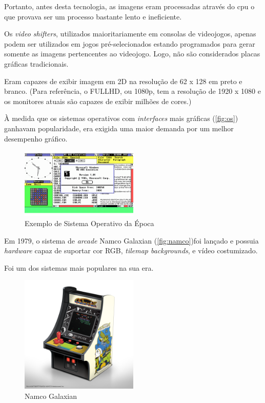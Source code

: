 \documentclass{report}
\begin{document}
Portanto, antes desta tecnologia, as imagens eram processadas através do \ac{cpu} o que provava ser um processo bastante lento e ineficiente. 

Os \textit{video shifters}, utilizados maioritariamente em consolas de videojogos, apenas podem ser utilizados em jogos pré-selecionados estando programados para gerar somente as imagens pertencentes ao videojogo. Logo, não são considerados placas gráficas tradicionais.

Eram capazes de exibir imagem em 2D na resolução de 62 x 128 em preto e branco. (Para referência, o FULLHD, ou 1080p, tem a resolução de 1920 x 1080 e os monitores atuais são capazes de exibir milhões de cores.)
\clearpage

\vspace{10mm}

À medida que os sistemas operativos com \textit{interfaces} mais gráficas (\autoref{fig:os}) ganhavam popularidade, era exigida uma maior demanda por um melhor desempenho gráfico.

\begin{figure}[h]
\centering
\includegraphics[width=0.5\textwidth]{windows.png}
\caption{Exemplo de Sistema Operativo da Época}
\label{fig:os}
\end{figure}

Em 1979, o sistema de \textit{arcade} Namco Galaxian (\autoref{fig:namco})foi lançado e possuia \textit{hardware} capaz de suportar cor RGB, \textit{tilemap backgrounds}, e vídeo costumizado. 

Foi um dos sistemas mais populares na sua era.

\begin{figure}[h]
\centering
\includegraphics[width=0.5\textwidth]{namco.png}
\caption{Namco Galaxian}
\label{fig:namco}
\end{figure}
\clearpage
\end{document}
